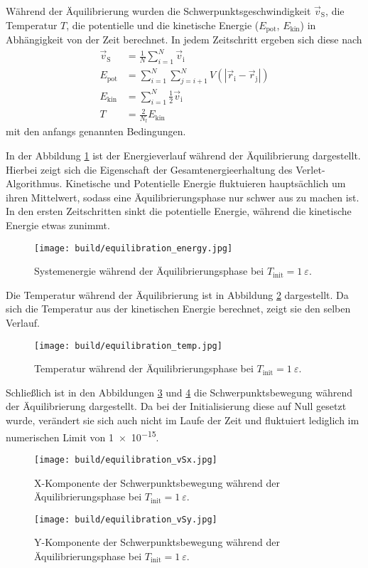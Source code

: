 Während der Äquilibrierung wurden die Schwerpunktsgeschwindigkeit $\vec{v}_\text{S}$,
die Temperatur $T$, die potentielle und die kinetische Energie
($E_\text{pot}$, $E_\text{kin}$) in Abhängigkeit von der Zeit berechnet.
In jedem Zeitschritt ergeben sich diese nach
\begin{align*}
    \vec{v}_\text{S} &= \frac{1}{N} \sum_{i=1}^N \vec{v}_\text{i} \\
    E_\text{pot} &= \sum_{i=1}^N \sum_{j=i+1}^N
        V\!\left(\left|\vec{r}_\text{i} - \vec{r}_\text{j}\right|\right) \\
    E_\text{kin} &= \sum_{i=1}^N \frac{1}{2} \vec{v}_\text{i} \\
    T &= \frac{2}{N_\text{f}} E_\text{kin}
\end{align*}
mit den anfangs genannten Bedingungen.

In der Abbildung \ref{fig:equilibration_energy} ist der Energieverlauf während der
Äquilibrierung dargestellt.
Hierbei zeigt sich die Eigenschaft der Gesamtenergieerhaltung des Verlet-Algorithmus.
Kinetische und Potentielle Energie fluktuieren hauptsächlich um ihren Mittelwert,
sodass eine Äquilibrierungsphase nur schwer aus zu machen ist. In den ersten
Zeitschritten sinkt die potentielle Energie, während die kinetische Energie etwas zunimmt.
\begin{figure}
    \centering
    \texttt{[image: build/equilibration\_energy.jpg]}
    \caption{Systemenergie während der Äquilibrierungsphase bei $T_\text{init} = 1\:\varepsilon$.}
    \label{fig:equilibration_energy}
\end{figure}

Die Temperatur während der Äquilibrierung ist in Abbildung \ref{fig:equilibration_temp}
dargestellt. Da sich die Temperatur aus der kinetischen Energie berechnet, zeigt sie
den selben Verlauf.
\begin{figure}
    \centering
    \texttt{[image: build/equilibration\_temp.jpg]}
    \caption{Temperatur während der Äquilibrierungsphase bei $T_\text{init} = 1\:\varepsilon$.}
    \label{fig:equilibration_temp}
\end{figure}

Schließlich ist in den Abbildungen \ref{fig:equilibration_vSx} und
\ref{fig:equilibration_vSy} die Schwerpunktsbewegung während der Äquilibrierung
dargestellt. Da bei der Initialisierung diese auf Null gesetzt wurde, verändert sie sich
auch nicht im Laufe der Zeit und fluktuiert lediglich im numerischen Limit von
\num{1e-15}.
\begin{figure}
    \centering
    \texttt{[image: build/equilibration\_vSx.jpg]}
    \caption{X-Komponente der Schwerpunktsbewegung während der Äquilibrierungsphase bei $T_\text{init} = 1\:\varepsilon$.}
    \label{fig:equilibration_vSx}
\end{figure}
\begin{figure}
    \centering
    \texttt{[image: build/equilibration\_vSy.jpg]}
    \caption{Y-Komponente der Schwerpunktsbewegung während der Äquilibrierungsphase bei $T_\text{init} = 1\:\varepsilon$.}
    \label{fig:equilibration_vSy}
\end{figure}


